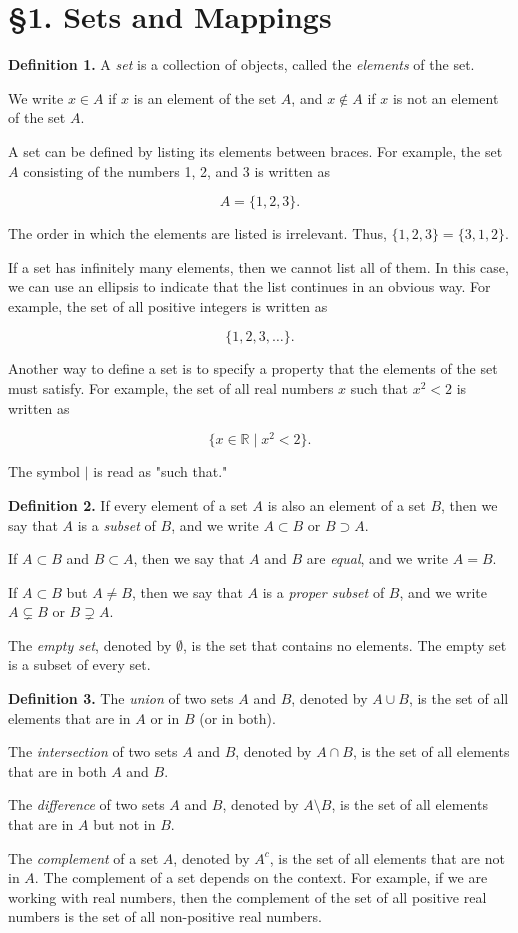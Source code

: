 \section*{§1. Sets and Mappings}

\textbf{Definition 1.} A \textit{set} is a collection of objects, called the \textit{elements} of the set.

We write $x \in A$ if $x$ is an element of the set $A$, and $x \notin A$ if $x$ is not an element of the set $A$.

A set can be defined by listing its elements between braces. For example, the set $A$ consisting of the numbers 1, 2, and 3 is written as

\[
A = \{1, 2, 3\}.
\]

The order in which the elements are listed is irrelevant. Thus, $\{1, 2, 3\} = \{3, 1, 2\}$.

If a set has infinitely many elements, then we cannot list all of them. In this case, we can use an ellipsis to indicate that the list continues in an obvious way. For example, the set of all positive integers is written as

\[
\{1, 2, 3, \dots\}.
\]

Another way to define a set is to specify a property that the elements of the set must satisfy. For example, the set of all real numbers $x$ such that $x^2 < 2$ is written as

\[
\{x \in \mathbb{R} \mid x^2 < 2\}.
\]

The symbol $\mid$ is read as "such that."

\textbf{Definition 2.} If every element of a set $A$ is also an element of a set $B$, then we say that $A$ is a \textit{subset} of $B$, and we write $A \subset B$ or $B \supset A$.

If $A \subset B$ and $B \subset A$, then we say that $A$ and $B$ are \textit{equal}, and we write $A = B$.

If $A \subset B$ but $A \neq B$, then we say that $A$ is a \textit{proper subset} of $B$, and we write $A \subsetneq B$ or $B \supsetneq A$.

The \textit{empty set}, denoted by $\emptyset$, is the set that contains no elements. The empty set is a subset of every set.

\textbf{Definition 3.} The \textit{union} of two sets $A$ and $B$, denoted by $A \cup B$, is the set of all elements that are in $A$ or in $B$ (or in both).

The \textit{intersection} of two sets $A$ and $B$, denoted by $A \cap B$, is the set of all elements that are in both $A$ and $B$.

The \textit{difference} of two sets $A$ and $B$, denoted by $A \setminus B$, is the set of all elements that are in $A$ but not in $B$.

The \textit{complement} of a set $A$, denoted by $A^c$, is the set of all elements that are not in $A$. The complement of a set depends on the context. For example, if we are working with real numbers, then the complement of the set of all positive real numbers is the set of all non-positive real numbers.